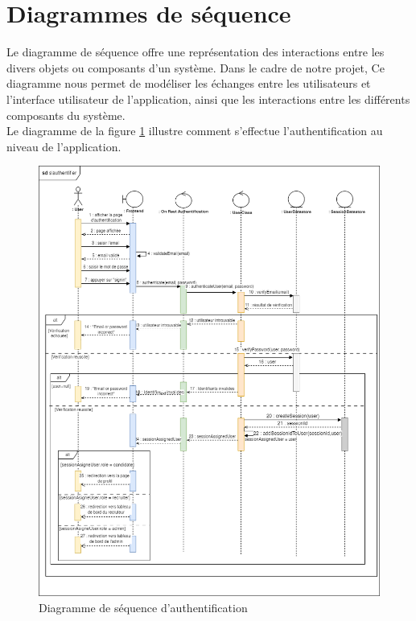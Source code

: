 \section{Diagrammes de séquence}
Le diagramme de séquence offre une représentation  
des interactions entre les divers objets ou 
composants d’un système. Dans le cadre de notre projet, 
Ce diagramme nous permet de modéliser les échanges entre les utilisateurs et l’interface 
utilisateur de l’application, ainsi que les interactions entre les différents composants du système.
\\

Le diagramme de la figure \ref{fig:seq1} illustre comment s'effectue l'authentification au niveau de l'application.
\\
\begin{figure}[H]
   \centering
   \includegraphics[scale=0.5]{diag/auth.png} %
   \caption{Diagramme de séquence d’authentification}
   \label{fig:seq1}
\end{figure}

